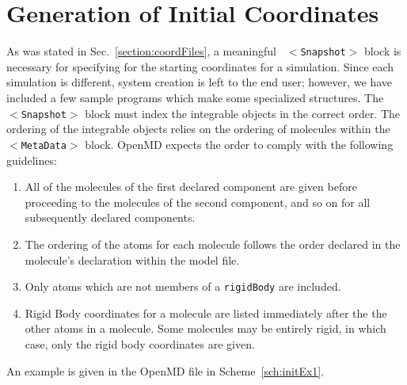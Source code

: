 \documentclass[]{book}
\begin{document}
\section{\label{section:initCoords}Generation of Initial Coordinates}

As was stated in Sec.~\ref{section:coordFiles}, a meaningful {\tt
$<$Snapshot$>$} block is necessary for specifying for the starting
coordinates for a simulation.  Since each simulation is different,
system creation is left to the end user; however, we have included a
few sample programs which make some specialized structures.  The {\tt
$<$Snapshot$>$} block must index the integrable objects in the correct
order.  The ordering of the integrable objects relies on the ordering
of molecules within the {\tt $<$MetaData$>$} block. {\sc OpenMD}
expects the order to comply with the following guidelines:
\begin{enumerate}
\item All of the molecules of the first declared component are given
before proceeding to the molecules of the second component, and so on
for all subsequently declared components.
\item The ordering of the atoms for each molecule follows the order
declared in the molecule's declaration within the model file.
\item Only atoms which are not members of a {\tt rigidBody} are
included.
\item Rigid Body coordinates for a molecule are listed immediately
after the the other atoms in a molecule.  Some molecules may be
entirely rigid, in which case, only the rigid body coordinates are
given.
\end{enumerate}
An example is given in the {\sc OpenMD} file in Scheme~\ref{sch:initEx1}.
\end{document}
